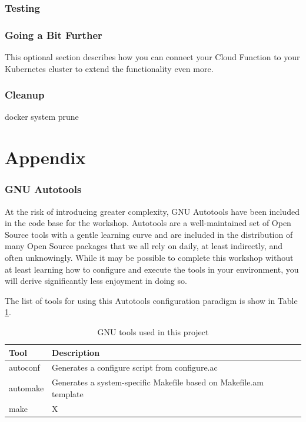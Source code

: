 \section{\label{sec:test}Testing}

\section{\label{sec:next}Going a Bit Further}

\justifying
This optional section describes how you can connect your Cloud Function to your Kubernetes cluster to extend the functionality even more.

\section{\label{sec:cleanup}Cleanup}

\justifying

docker system prune

\clearpage
\part{Appendix}

\appendix

\section{\label{sec:autotools}GNU Autotools}

\justifying
At the risk of introducing greater complexity, GNU Autotools have been included in the code base for the workshop. Autotools
are a well-maintained set of Open Source tools with a gentle learning curve and are included in the distribution of many Open
Source packages that we all rely on daily, at least indirectly, and often unknowingly. While it may be possible to complete this workshop
without at least learning how to configure and execute the tools in your environment, you will derive significantly less enjoyment
in doing so.
\vspace{2mm}

\justifying
The list of tools for using this Autotools configuration paradigm is show in Table \ref{Autotools}.
\vspace{2mm}

\begin{table}[ht]
	\centering
	\begin{tabular}{|l|l|}\hline
		Tool     & Description                                                        \\\hline
		autoconf & Generates a configure script from configure.ac                     \\\hline
		automake & Generates a system-specific Makefile based on Makefile.am template \\\hline
		make     & X                                                                  \\\hline
	\end{tabular}
	\caption{GNU tools used in this project}
	\label{Autotools}
\end{table}
\vspace{2mm}

